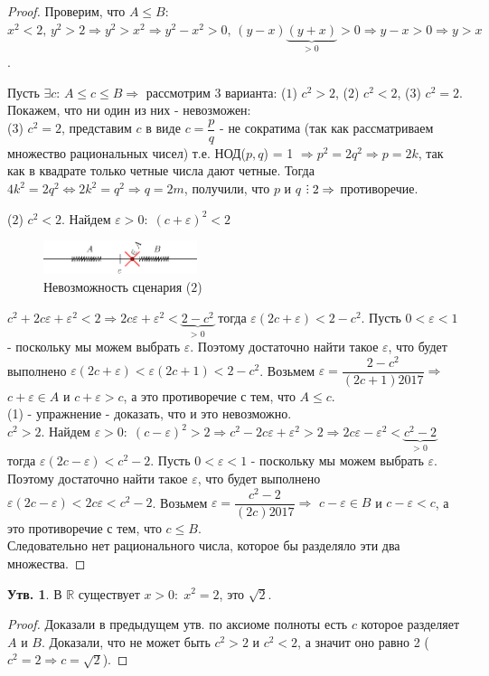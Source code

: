 \documentclass[12pt]{article}
\theoremstyle{definition}
\newtheorem{prop}{Утв.}
\DeclareRobustCommand{\divby}{%
	\mathrel{\text{\vbox{\baselineskip.65ex\lineskiplimit0pt\hbox{.}\hbox{.}\hbox{.}}}}%
}
\begin{document}
\begin{proof}
Проверим, что $A \leq B$: $x^2 < 2, \, y^2 > 2 \Rightarrow y^2 > x^2 \Rightarrow y^2 - x^2 > 0, \, (y-x)\underbrace{(y+x)}_\text{> 0} > 0 \Rightarrow y-x>0 \Rightarrow y >x$.

Пусть $\exists c \colon \, A \leq c \leq B \Rightarrow$ рассмотрим $3$ варианта: ($1$) $c^2 > 2$, ($2$) $c^2 < 2$, ($3$) $c^2 = 2$. Покажем, что ни один из них - невозможен:\\
($3$) $c^2 = 2$, представим $c$ в виде $c = \dfrac{p}{q}$ - не сократима (так как рассматриваем множество рациональных чисел) т.е. НОД($p,q$) = 1 $\Rightarrow p^2 = 2q^2 \Rightarrow p = 2k$, так как в квадрате только четные числа дают четные. Тогда $4k^2 = 2q^2 \Leftrightarrow 2k^2 = q^2 \Rightarrow q = 2m$, получили, что $p$ и $q$ $\divby 2 \Rightarrow$ противоречие.

($2$) $c^2 < 2$. Найдем $\varepsilon > 0 \colon \; (c + \varepsilon)^2 < 2$
\begin{figure}[H]
	\centering
	\includegraphics[width=0.4\textwidth]{6_2.eps}
	\caption{Невозможность сценария ($2$)}
	\label{fig:6_2}
\end{figure}
$c^2 + 2c\varepsilon + \varepsilon^2 < 2 \Rightarrow 2c\varepsilon + \varepsilon^2 < \underbrace{2-c^2}_\text{> 0}$ тогда $\varepsilon(2c + \varepsilon) < 2-c^2$.
Пусть $0 < \varepsilon < 1$ - поскольку мы можем выбрать $\varepsilon$. Поэтому достаточно найти такое $\varepsilon$, что будет выполнено $\varepsilon(2c + \varepsilon) < \varepsilon(2c + 1) < 2-c^2$. Возьмем $\varepsilon = \dfrac{2-c^2}{(2c+1)2017} \Rightarrow$  $c + \varepsilon \in A$ и $ c+ \varepsilon > c$, а это противоречие с тем, что $A \leq c$.\\
(1) - упражнение - доказать, что и это невозможно.\\
$c^2 > 2$. Найдем $\varepsilon > 0 \colon \; (c - \varepsilon)^2 > 2 \Rightarrow c^2 - 2c\varepsilon + \varepsilon^2 > 2 \Rightarrow  2c\varepsilon - \varepsilon^2  < \underbrace{c^2-2}_\text{> 0}$ тогда $\varepsilon(2c - \varepsilon ) < c^2 - 2$.
Пусть $0 < \varepsilon < 1$ - поскольку мы можем выбрать $\varepsilon$. Поэтому достаточно найти такое $\varepsilon$, что будет выполнено $\varepsilon(2c - \varepsilon) < 2c\varepsilon < c^2 - 2$. Возьмем $\varepsilon = \dfrac{c^2 - 2}{(2c)2017} \Rightarrow$  $c - \varepsilon \in B$ и $ c - \varepsilon < c$, а это противоречие с тем, что $c \leq B$.\\
Следовательно нет рационального числа, которое бы разделяло эти два множества.
\end{proof}
\begin{prop}
	В $\mathbb{R}$ существует $x>0 \colon \; x^2 = 2$, это $\sqrt{2}$.
\end{prop}
\begin{proof}
	Доказали в предыдущем утв. по аксиоме полноты есть $c$ которое разделяет $A$ и $B$. Доказали, что не может быть $c^2 > 2$ и $c^2 < 2$, а значит оно равно 2 ($c^2 = 2 \Rightarrow c = \sqrt{2}$).
\end{proof}
\end{document}
